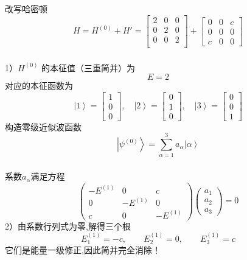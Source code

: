 \begin{frame}
  \frametitle{}
\解 改写哈密顿
$$ H = H^{(0)} + H' = \begin{bmatrix}
  2 & 0 & 0  \\
  0 & 2 & 0  \\
  0 & 0 & 2 \\ 
\end{bmatrix} + \begin{bmatrix}
  0 & 0 & c  \\
  0 & 0 & 0  \\
  c & 0 & 0  
\end{bmatrix} 
$$
\end{frame}

\begin{frame}
  \frametitle{}
  1）$ H^{(0)}  $ 的本征值（三重简并）为
  \[ E = 2\]  
  对应的本征函数为
  \[ \left\vert 1\right\rangle  = \begin{bmatrix}
    1  \\
    0  \\
    0  
  \end{bmatrix} , \quad \left\vert 2 \right\rangle  = \begin{bmatrix}
    0  \\
    1  \\
    0  
  \end{bmatrix} , \quad
  \left\vert 3 \right\rangle  = \begin{bmatrix}
    0  \\
    0  \\
    1  
  \end{bmatrix} \]
  构造零级近似波函数
  $$\left\vert \psi ^{(0)} \right\rangle = \sum_{\alpha=1}^3 a_\alpha \left\vert \alpha \right\rangle $$
\end{frame} 

\begin{frame}
  \frametitle{}
系数$a_\alpha$满足方程
\begin{equation}\label{eq:alpha}
  \begin{pmatrix}
    -E^{(1)} & 0 & c \\
    0 & -E^{(1)} & 0 \\
    c & 0 & -E^{(1)} \end{pmatrix}
    \begin{pmatrix}a_{1} \\a_{2} \\ a_{3} \end{pmatrix} =0
\end{equation}
2）由系数行列式为零,解得三个根
\[E_{1}^{(1)} = -c, \qquad E_{2}^{(1)} = 0, \qquad E_{3}^{(1)} = c\]
它们是能量一级修正,因此简并完全消除！
\end{frame} 

